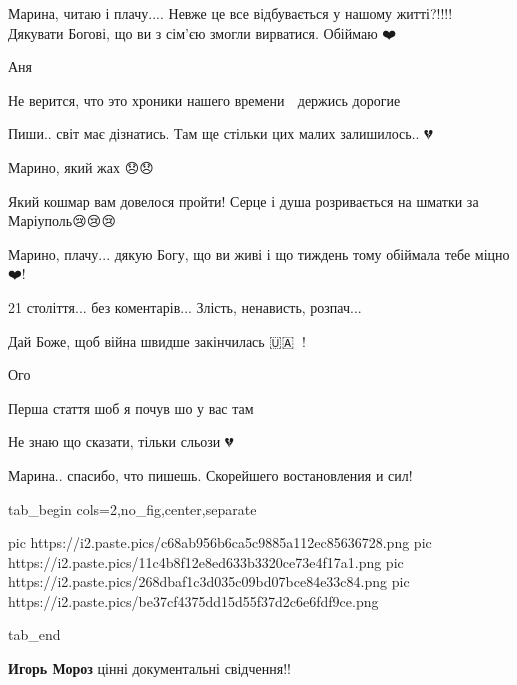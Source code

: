  
 
 
 
 

\qqSecCmt


Марина, читаю і плачу.... Невже це все відбувається у нашому житті?!!!!
Дякувати Богові, що ви з сім'єю змогли вирватися. Обіймаю ❤️

\begin{itemize} %
Аня💙💛
\end{itemize} %


Не верится, что это хроники нашего времени 🥺 держись дорогие 🙏🇺🇦


Пиши.. світ має дізнатись. Там ще стільки цих малих залишилось.. 💔


Марино, який жах 😞😞

Який кошмар вам довелося пройти! Серце і душа розривається на шматки за
Маріуполь😢😢😢


Марино, плачу... дякую Богу, що ви живі і що тиждень тому обіймала тебе міцно ❤️!

21 століття... без коментарів... Злість, ненависть, розпач...

Дай Боже, щоб війна швидше закінчилась 🇺🇦💙💛!


Ого

Перша стаття шоб я почув шо у вас там


Не знаю що сказати, тільки сльози 💔


Марина.. спасибо, что пишешь. Скорейшего востановления и сил!


\ifcmt
  tab_begin cols=2,no_fig,center,separate

     pic https://i2.paste.pics/c68ab956b6ca5c9885a112ec85636728.png
     pic https://i2.paste.pics/11c4b8f12e8ed633b3320ce73e4f17a1.png
		 pic https://i2.paste.pics/268dbaf1c3d035c09bd07bce84e33c84.png
		 pic https://i2.paste.pics/be37cf4375dd15d55f37d2c6e6fdf9ce.png

  tab_end
\fi

\begin{itemize} %
\textbf{Игорь Мороз} цінні документальні свідчення!!
\end{itemize} %
